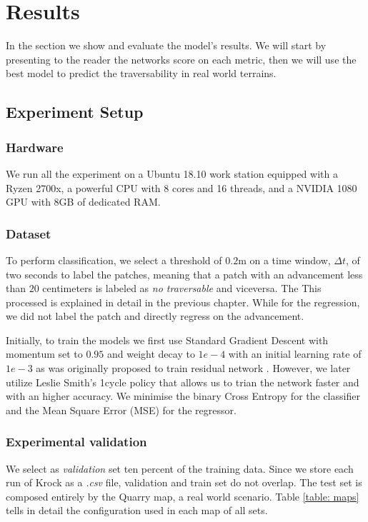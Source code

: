\documentclass[../document.tex]{subfiles}
\begin{document}
\section{Results}
In the section we show and evaluate the model's results. We will start by presenting to the reader the networks score on each metric, then we will use the best model to predict the traversability in real world terrains. 
\subsection{Experiment Setup}
\subsubsection{Hardware}
We run all the experiment on a Ubuntu 18.10  work station equipped with a Ryzen 2700x, a powerful CPU with 8 cores and 16 threads, and a NVIDIA 1080 GPU with 8GB of dedicated RAM.
\subsubsection{Dataset}
To perform classification, we select a threshold of $0.2$m on a time window, $\Delta t$, of two seconds to label the patches, meaning that a patch with an advancement less than $20$ centimeters is labeled as \emph{no traversable} and viceversa. The  This processed is explained in detail in the previous chapter. While for the regression, we did not label the patch and directly regress on the advancement.

Initially, to train the models we first use Standard Gradient Descent with momentum set to $0.95$ and weight decay to $1e-4$ with an initial learning rate of $1e-3$ as was originally proposed to train residual network \cite{he2015deep}. However, we later utilize Leslie Smith's 1cycle policy \cite{1cycle} that allows us to trian the network faster and with an higher accuracy. We minimise the binary Cross Entropy for the classifier and the  Mean Square Error (MSE) for the regressor.
\subsubsection{Experimental validation}
We select as \emph{validation} set ten percent of the training data. Since we store each run of Krock as a \emph{.csv} file, validation and train set do not overlap. 
The test set is composed entirely by the Quarry map, a real world scenario. Table \ref{table: maps} tells in detail the configuration used in each map of all sets.
\end{document}
